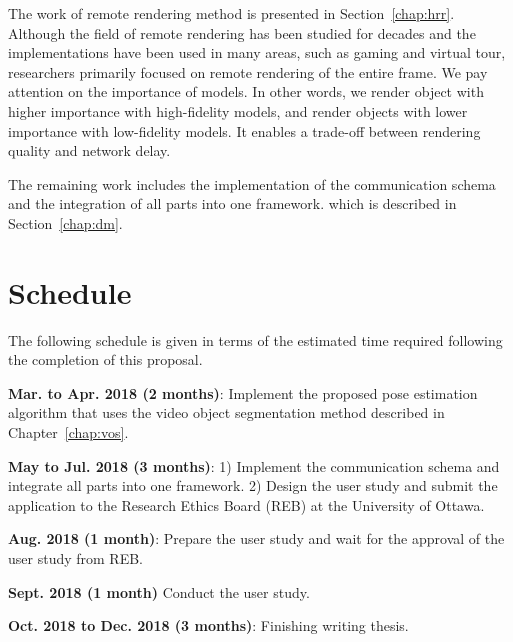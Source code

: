 The work of remote rendering method is presented in Section~\ref{chap:hrr}.
Although the field of remote rendering has been studied for decades and the implementations have been used in many areas, such as gaming and virtual tour, researchers primarily focused on remote rendering of the entire frame.
We pay attention on the importance of models. In other words, we render object with higher importance with high-fidelity models, and render objects with lower importance with low-fidelity models.
It enables a trade-off between rendering quality and network delay.

The remaining work includes the implementation of the communication schema and the integration of all parts into one framework. which is described in Section~\ref{chap:dm}.

\section{Schedule}
\label{sec:c:s}

The following schedule is given in terms of the estimated time required following the completion of this proposal.

\textbf{Mar. to Apr. 2018 (2 months)}: Implement the proposed pose estimation algorithm that uses the video object segmentation method described in Chapter~\ref{chap:vos}.

\textbf{May to Jul. 2018 (3 months)}: 1) Implement the communication schema and integrate all parts into one framework. 2) Design the user study and submit the application to the Research Ethics Board (REB) at the University of Ottawa.

\textbf{Aug. 2018 (1 month)}: Prepare the user study and wait for the approval of the user study from REB.

\textbf{Sept. 2018 (1 month)} Conduct the user study.

\textbf{Oct. 2018 to Dec. 2018 (3 months)}: Finishing writing thesis.
